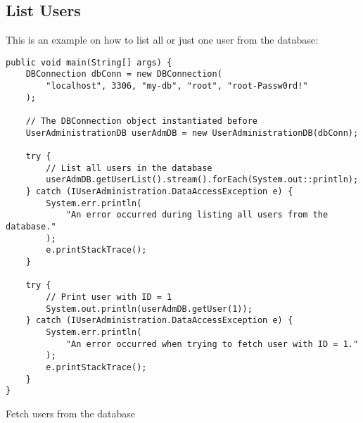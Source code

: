 \subsection{List Users}
This is an example on how to list all or just one user from the database:

\begin{listing}[ht]
\begin{verbatim}
public void main(String[] args) {
    DBConnection dbConn = new DBConnection(
        "localhost", 3306, "my-db", "root", "root-Passw0rd!"
    );
    
    // The DBConnection object instantiated before
    UserAdministrationDB userAdmDB = new UserAdministrationDB(dbConn); 
    
    try {
        // List all users in the database
        userAdmDB.getUserList().stream().forEach(System.out::println); 
    } catch (IUserAdministration.DataAccessException e) {
        System.err.println(
            "An error occurred during listing all users from the database."
        );
        e.printStackTrace();
    }
    
    try {
        // Print user with ID = 1
        System.out.println(userAdmDB.getUser(1));                      
    } catch (IUserAdministration.DataAccessException e) {
        System.err.println(
            "An error occurred when trying to fetch user with ID = 1."
        );
        e.printStackTrace();
    }
}
\end{verbatim}
\caption{Fetch users from the database}
\label{listing:2}
\end{listing}
